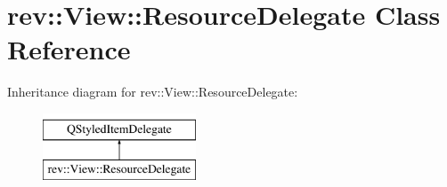 \hypertarget{classrev_1_1_view_1_1_resource_delegate}{}\section{rev\+::View\+::Resource\+Delegate Class Reference}
\label{classrev_1_1_view_1_1_resource_delegate}
Inheritance diagram for rev\+::View\+::Resource\+Delegate\+:\begin{figure}[H]
\begin{center}
\leavevmode
\includegraphics[height=2.000000cm]{classrev_1_1_view_1_1_resource_delegate}
\end{center}
\end{figure}
